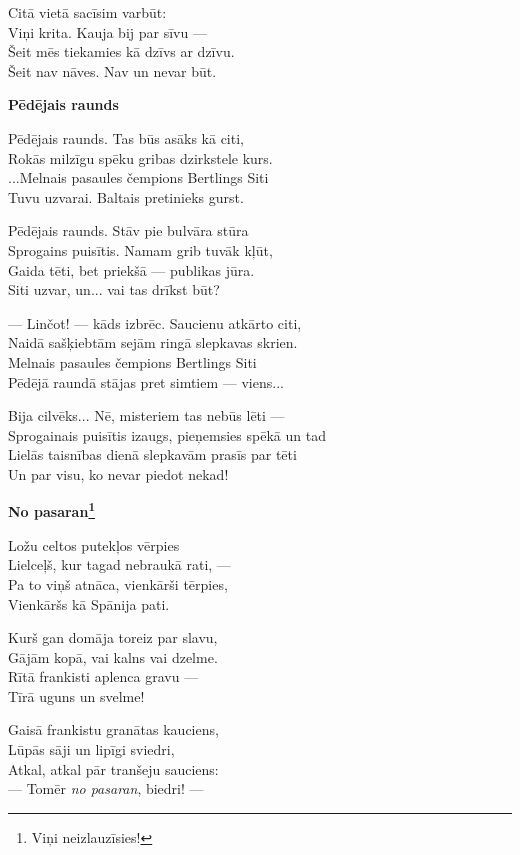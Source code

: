 \documentclass[11pt]{article}
\begin{document}
Citā vietā sacīsim varbūt:\\
Viņi krita. Kauja bij par sīvu ---\\
Šeit mēs tiekamies kā dzīvs ar dzīvu.\\
Šeit nav nāves. Nav un nevar būt.

\newpage

{\bf Pēdējais raunds}

Pēdējais raunds. Tas būs asāks kā citi,\\
Rokās milzīgu spēku gribas dzirkstele kurs.\\
...Melnais pasaules čempions Bertlings Siti\\
Tuvu uzvarai. Baltais pretinieks gurst.

Pēdējais raunds. Stāv pie bulvāra stūra\\
Sprogains puisītis. Namam grib tuvāk kļūt,\\
Gaida tēti, bet priekšā --- publikas jūra.\\
Siti uzvar, un... vai tas drīkst būt?

--- Linčot! --- kāds izbrēc. Saucienu atkārto citi,\\
Naidā sašķiebtām sejām ringā slepkavas skrien.\\
Melnais pasaules čempions Bertlings Siti\\
Pēdējā raundā stājas pret simtiem --- viens...

Bija cilvēks... Nē, misteriem tas nebūs lēti ---\\
Sprogainais puisītis izaugs, pieņemsies spēkā un tad\\
Lielās taisnības dienā slepkavām prasīs par tēti\\
Un par visu, ko nevar piedot nekad!

\newpage

{\bf No pasaran\footnote{Viņi neizlauzīsies!}}

Ložu celtos putekļos vērpies\\
Lielceļš, kur tagad nebraukā rati, ---\\
Pa to viņš atnāca, vienkārši tērpies,\\
Vienkāršs kā Spānija pati.

Kurš gan domāja toreiz par slavu,\\
Gājām kopā, vai kalns vai dzelme.\\
Rītā frankisti aplenca gravu ---\\
Tīrā uguns un svelme!

Gaisā frankistu granātas kauciens,\\
Lūpās sāji un lipīgi sviedri,\\
Atkal, atkal pār tranšeju sauciens:\\
--- Tomēr {\em no pasaran}, biedri! ---
\end{document}
